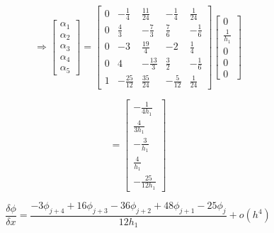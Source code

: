\documentclass[12pt,a4paper]{report}
\begin{document}
\begin{enumerate}
$$\Rightarrow \begin{bmatrix}
\alpha_1 \\ \alpha_2 \\ \alpha_3 \\ \alpha_4 \\ \alpha_5
\end{bmatrix} = 
\begin{bmatrix}
0 & -\frac{1}{4} & \frac{11}{24} & -\frac{1}{4} & \frac{1}{24} \\
0 & \frac{4}{3} & -\frac{7}{3} & \frac{7}{6} & -\frac{1}{6} \\
0 & -3 & \frac{19}{4} & -2 & \frac{1}{4} \\
0 & 4 & -\frac{13}{3} & \frac{3}{2} & -\frac{1}{6} \\
1 & -\frac{25}{12} & \frac{35}{24} & -\frac{5}{12} & \frac{1}{24} 
\end{bmatrix}
\begin{bmatrix}
0 \\ \frac{1}{h_1} \\ 0 \\ 0 \\ 0
\end{bmatrix}$$

$$= \begin{bmatrix}
-\frac{1}{4h_1} \\ \frac{4}{3h_1} \\ -\frac{3}{h_1} \\ \frac{4}{h_1} \\ -\frac{25}{12h_1}
\end{bmatrix}$$

$$\frac{\delta\phi}{\delta x} = \frac{-3\phi_{j+4} + 16\phi_{j+3} - 36\phi_{j+2} + 48\phi_{j+1} - 25\phi_{j}}{12h_1} + o\left(h^4\right)$$
\end{enumerate}
\end{document}
